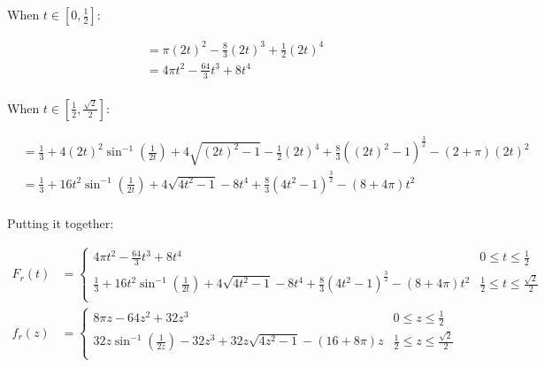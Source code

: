 \documentclass{article}
\begin{document}
When $t \in \left[ 0, \frac{1}{2} \right]$:

\begin{align*}
&= \pi (2t)^2 - \frac{8}{3} (2t)^3 + \frac{1}{2}(2t)^4 \\
&= 4\pi t^2 - \frac{64}{3}t^3 + 8t^4 \\
\end{align*}

When $t \in \left[ \frac{1}{2}, \frac{\sqrt{2}}{2} \right]$:

\begin{align*}
&= \frac{1}{3} + 4(2t)^2 \sin^{-1} \left( \frac{1}{2t} \right) + 4\sqrt{(2t)^2-1} - \frac{1}{2} (2t)^4 + \frac{8}{3}((2t)^2 - 1)^\frac{3}{2} - (2 + \pi) (2t)^2 \\
&= \frac{1}{3} + 16t^2 \sin^{-1} \left( \frac{1}{2t} \right) + 4\sqrt{4t^2-1} - 8t^4 + \frac{8}{3}(4t^2 - 1)^\frac{3}{2} - (8 + 4\pi)t^2 \\
\end{align*}

Putting it together:

\begin{align*}
F_r(t) &=
\begin{cases}
    4\pi t^2 - \frac{64}{3}t^3 + 8t^4
        & 0 \leq t \leq \frac{1}{2} \\
    \frac{1}{3} + 16t^2 \sin^{-1} \left( \frac{1}{2t} \right) + 4\sqrt{4t^2-1} - 8t^4 + \frac{8}{3}(4t^2 - 1)^\frac{3}{2} - (8 + 4\pi)t^2
        & \frac{1}{2} \leq t \leq \frac{\sqrt{2}}{2} \\
\end{cases}
\\
f_r(z) &=
\begin{cases}
    8\pi z - 64z^2 + 32z^3
        & 0 \leq z \leq \frac{1}{2} \\
    32z \sin^{-1} \left( \frac{1}{2z} \right) - 32z^3 + 32z\sqrt{4z^2 - 1} - (16 + 8\pi)z
        & \frac{1}{2} \leq z \leq \frac{\sqrt{2}}{2} \\
\end{cases}
\end{align*}
\end{document}
